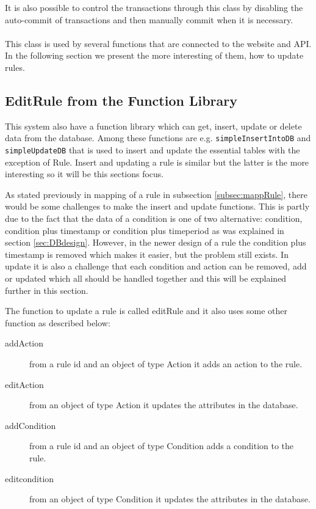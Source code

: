 It is also possible to control the transactions through this class by disabling the auto-commit of transactions and then manually commit when it is necessary. \\\\

This class is used by several functions that are connected to the website and API. In the following section we present the more interesting of them, how to update rules. 

\subsection{EditRule from the Function Library}
\label{subsec:dbRule}
This system also have a function library which can get, insert, update or delete data from the database. Among these functions are e.g. \texttt{simpleInsertIntoDB} and \texttt{simpleUpdateDB} that is used to insert and update the essential tables with the exception of Rule. Insert and updating a rule is similar but the latter is the more interesting so it will be this sections focus. 

As stated previously in mapping of a rule in subsection \vref{subsec:mappRule}, there would be some challenges to make the insert and update functions. This is partly due to the fact that the data of a condition  is one of two alternative: condition, condition plus timestamp  or condition plus timeperiod as was explained in section \vref{sec:DBdesign}. However, in the newer design of a rule the condition plus timestamp is removed which makes it easier, but the problem still exists. In update it is also a challenge that each condition and action can be removed, add or updated which all should be handled together and this will be explained further in this section. 

The function to update a rule is called editRule and it also uses some other function as described below:

\begin{description}
	\item[addAction] from a rule id and an object of type Action it adds an action to the rule.
	\item[editAction] from an object of type Action it updates the attributes in the database.   
	\item[addCondition] from a rule id and an object of type Condition adds a condition to the rule.
	\item[editcondition] from an object of type Condition it updates the attributes in the database.   
\end{description}

